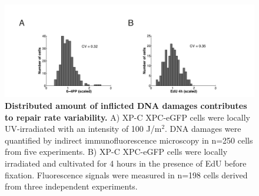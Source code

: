 \begin{figure}[htbp]
	\begin{center}
		\includegraphics[width=1\textwidth]{Abbildungen/figure3_5.pdf}
		\caption{\textbf{Distributed amount of inflicted DNA damages contributes to repair rate variability.} A) XP-C XPC-eGFP cells were locally UV-irradiated with an intensity of 100 J/$\text{m}^\text{2}$. DNA damages were quantified by indirect immunofluorescence microscopy in n=250 cells from five experiments. B) XP-C XPC-eGFP cells were locally irradiated and cultivated for 4 hours in the presence of EdU before fixation. Fluorescence signals were measured in n=198 cells derived from three independent experiments. }
		\label{fig:DamageDist}
	\end{center}
\end{figure}

